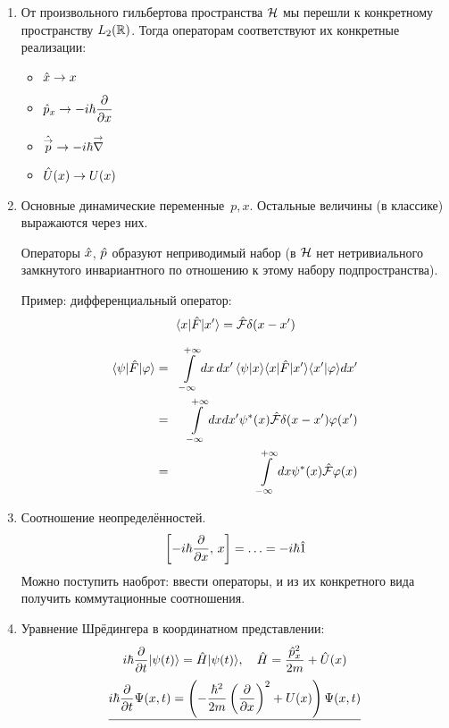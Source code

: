 \begin{enumerate}
  \item От произвольного гильбертова пространства $\H$ мы перешли к конкретному пространству $L_2 (\R)$. Тогда операторам соответствуют их конкретные реализации:
      \begin{itemize}
        \item $\Hat x \to x$
        \item $\Hat p_x \to -i \hbar \ud{}{x}$
        \item $\Hat {\vec p} \to -i\hbar \vec \nabla$
        \item $\Hat U(x) \to U(x)$
      \end{itemize}
  \item Основные динамические переменные~$p, x$. Остальные величины (в классике) выражаются через них.
  
  
  \Ans Операторы $\Hat x$, $\Hat p$ образуют неприводимый набор (в $\H$ нет нетривиального замкнутого инвариантного по отношению к этому набору подпространства).
  
  Пример: дифференциальный оператор:
  $$
    \qtri{x}{\Hat F}{x'} = \Hat \F \dta(x - x')
  $$
  
 \begin{eqnarray*}
    \qtri{\psi}{\Hat F}{\phi} &=& \int\limits_{-\infty}^{+\infty} dx\, dx' \, \qs{\psi}{x}
    \qtri{x}{\Hat F}{x'} \qs{x'}{\phi} dx'\\
    &=& \int\limits_{-\infty}^{+\infty} dx dx' \psi^\ast(x) \Hat \F \dta (x - x') \phi(x') \\
    &=& \int\limits_{-\infty}^{+\infty} dx \psi^\ast (x) \Hat \F \phi(x)
 \end{eqnarray*}
 \item Соотношение неопределённостей.
 $$
    \left[ -i\hbar \ud{}{x}, \, x \right] = \ldots = -i\hbar \Hat 1
 $$
 Можно поступить наоброт: ввести операторы, и из их конкретного вида получить коммутационные соотношения.
 \item Уравнение Шрёдингера в координатном представлении:
 $$
    i\hbar \ud{}{t} \qu{\psi(t)} = \Hat H \qu{\psi(t)}, \quad \Hat H = \dfrac{\Hat{p}_x^2}{2m} + \Hat U(x)
 $$
 $$
    \underline{
        i\hbar \ud{}{t} \Psi(x, t) = \left( - \dfrac{\hbar^2}{2m} \left(\ud{}{x}\right)^2 + U(x) \right) \Psi(x, t)
    }
 $$
\end{enumerate}
